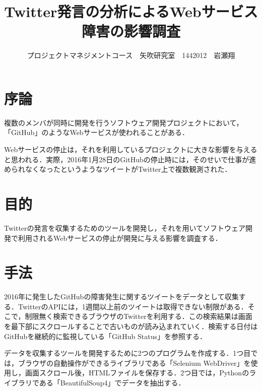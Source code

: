 \documentclass[uplatex,twocolumn,dvipdfmx]{jsarticle}
\title{\vspace{-5mm}\fontsize{14pt}{0pt}\selectfont Twitter発言の分析によるWebサービス障害の影響調査}
\author{\normalsize プロジェクトマネジメントコース　矢吹研究室　1442012　岩瀬翔}
\date{}
\begin{document}
\fontsize{10.5pt}{\baselineskip}\selectfont
\maketitle

\section{序論}\label{序論}

複数のメンバが同時に開発を行うソフトウェア開発プロジェクトにおいて，「GitHub」のようなWebサービスが使われることがある．

Webサービスの停止は，それを利用しているプロジェクトに大きな影響を与えると思われる．実際，2016年1月28日のGitHubの停止時には，そのせいで仕事が進められなくなったというようなツイートがTwitter上で複数観測された\cite{01}．

\section{目的}

Twitterの発言を収集するためのツールを開発し，それを用いてソフトウェア開発で利用されるWebサービスの停止が開発に与える影響を調査する．

\section{手法}
2016年に発生したGitHubの障害発生に関するツイートをデータとして収集する．TwitterのAPIには，1週間以上前のツイートは取得できない制限がある\cite{02}．そこで，制限無く検索できるブラウザのTwitterを利用する．この検索結果は画面を最下部にスクロールすることで古いものが読み込まれていく．検索する日付はGitHubを継続的に監視している「GitHub Status」を参照する．

データを収集するツールを開発するために2つのプログラムを作成する．1つ目では，ブラウザの自動操作ができるライブラリである「Selenium WebDriver」を使用し，画面スクロール後，HTMLファイルを保存する．2つ目では，Pythonのライブラリである「BeautifulSoup4」でデータを抽出する．
\end{document}
